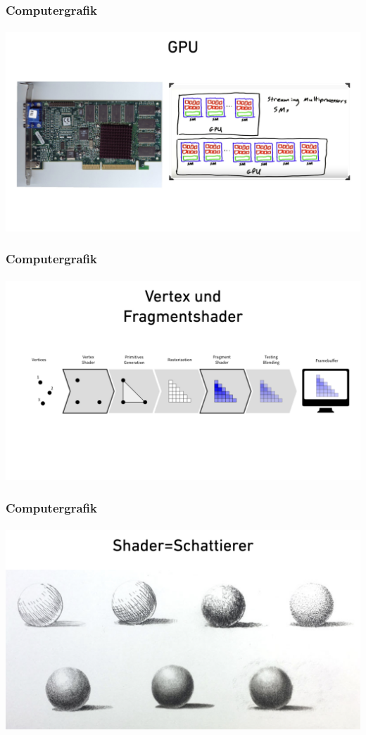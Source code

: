 \documentclass{beamer}
\begin{document}
\begin{frame}
    \frametitle{Computergrafik}
\framesubtitle{}

\includegraphics[scale=0.16]{images/Shaderday_Intro/Shaderday_Intro_004} \\
\end{frame}

\begin{frame}
    \frametitle{Computergrafik}
\framesubtitle{}

\includegraphics[scale=0.15]{images/Shaderday_Intro/Shaderday_Intro_007}

\end{frame}


\begin{frame}
    \frametitle{Computergrafik}
\framesubtitle{}

\includegraphics[scale=0.15]{images/Shaderday_Intro/Shaderday_Intro_001} 
\end{frame}
\end{document}

